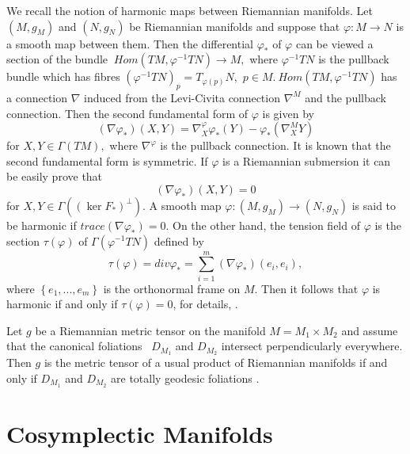 \documentclass{amsart}
\theoremstyle{plain}
\numberwithin{equation}{section}
\begin{document}
We recall the notion of harmonic maps between Riemannian manifolds. Let $(M,g_{M})$ and $(N,g_{N})$ be Riemannian manifolds and suppose that $\varphi
:M\rightarrow N$ is a smooth map between them. Then the differential $\varphi _{\ast }$ of $\varphi $ can be viewed a section of the bundle $\
Hom(TM,\varphi ^{-1}TN)\rightarrow M,$ where $\varphi ^{-1}TN$ is the
pullback bundle which has fibres $(\varphi ^{-1}TN)_{p}=T_{\varphi (p)}N,$ $p\in M.\ Hom(TM,\varphi ^{-1}TN)$ has a connection $\nabla $ induced from
the Levi-Civita connection $\nabla ^{M}$ and the pullback connection. Then
the second fundamental form of $\varphi $ is given by 
\begin{equation}
(\nabla \varphi _{\ast })(X,Y)=\nabla _{X}^{\varphi }\varphi _{\ast
}(Y)-\varphi _{\ast }(\nabla _{X}^{M}Y)  \label{5}
\end{equation}for $X,Y\in \Gamma (TM),$ where $\nabla ^{\varphi }$ is the pullback
connection. It is known that the second fundamental form is symmetric. If $\varphi $ is a Riemannian submersion it can be easily prove that 
\begin{equation}
(\nabla \varphi _{\ast })(X,Y)=0  \label{5a}
\end{equation}for $X,Y\in \Gamma ((\ker F_{\ast })^{\bot })$. A smooth map $\varphi
:(M,g_{M})\rightarrow (N,g_{N})$ is said to be harmonic if $trace(\nabla
\varphi _{\ast })=0.$ On the other hand, the tension field of $\varphi $ is
the section $\tau (\varphi )$ of $\Gamma (\varphi ^{-1}TN)$ defined by\begin{equation}
\tau (\varphi )=div\varphi _{\ast }=\sum_{i=1}^{m}(\nabla \varphi _{\ast
})(e_{i},e_{i}),  \label{6}
\end{equation}where $\left\{ e_{1},...,e_{m}\right\} $ is the orthonormal frame on $M$.
Then it follows that $\varphi $ is harmonic if and only if $\tau (\varphi
)=0 $, for details, \cite{B}.

Let $g$ be a Riemannian metric tensor on the manifold $M=M_{1}\times M_{2}$
and assume that the canonical foliations \ $D_{M_{1}}$ and $D_{M_{2}}$
intersect perpendicularly everywhere. Then $g$ is the metric tensor of a
usual product of Riemannian manifolds if and only if $D_{M_{1}}$ and $D_{M_{2}}$ are totally geodesic foliations \cite{PON}.

\section{\textbf{Cosymplectic Manifolds}}
\end{document}
